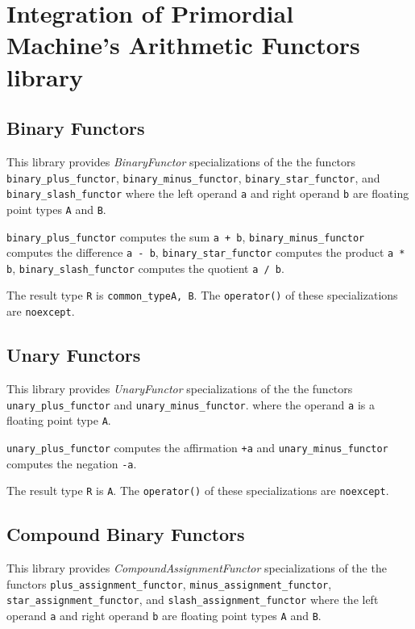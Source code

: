 \section{Integration of Primordial Machine's Arithmetic Functors   library}

\subsection{Binary Functors}
\noindent{}This library provides \textit{BinaryFunctor}    specializations of the
the functors
\texttt{binary\_plus\_functor},
\texttt{binary\_minus\_functor},
\texttt{binary\_star\_functor}, and
\texttt{binary\_slash\_functor}
where the left operand \texttt{a} and right operand \texttt{b} are floating point
types \texttt{A} and \texttt{B}.\newline

\texttt{binary\_plus\_functor} computes the sum \texttt{a + b},
\texttt{binary\_minus\_functor} computes the difference \texttt{a - b},
\texttt{binary\_star\_functor} computes the product \texttt{a * b},
\texttt{binary\_slash\_functor} computes the quotient \texttt{a / b}.\newline

The result type \texttt{R} is \texttt{common\_type\textlangle A, B\textrangle}.
The \texttt{operator()} of these specializations are \texttt{noexcept}.

\subsection{Unary Functors}
\noindent{}This library provides \textit{UnaryFunctor}    specializations of the
the functors
\texttt{unary\_plus\_functor} and
\texttt{unary\_minus\_functor}.
where the operand \texttt{a} is a floating point type \texttt{A}.\newline

\texttt{unary\_plus\_functor} computes the affirmation \texttt{+a} and
\texttt{unary\_minus\_functor} computes the negation \texttt{-a}.\newline

The result type \texttt{R} is \texttt{A}.
The \texttt{operator()} of these specializations are \texttt{noexcept}.

\subsection{Compound Binary Functors}
\noindent{}This library provides \textit{CompoundAssignmentFunctor}    specializations of the
the functors
\texttt{plus\_assignment\_functor},
\texttt{minus\_assignment\_functor},
\texttt{star\_assignment\_functor}, and
\texttt{slash\_assignment\_functor}
where the left operand \texttt{a} and right operand \texttt{b} are floating point
types \texttt{A} and \texttt{B}.\newline

